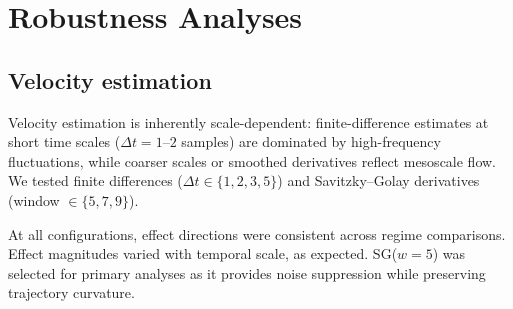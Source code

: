 \documentclass[5p,twocolumn,authoryear]{elsarticle}
\begin{document}
\section{Robustness Analyses}
\label{app:robustness}

\subsection{Velocity estimation}
\label{app:velocity_robustness}

Velocity estimation is inherently scale-dependent: finite-difference estimates at short time scales ($\Delta t = 1\text{--}2$ samples) are dominated by high-frequency fluctuations, while coarser scales or smoothed derivatives reflect mesoscale flow. We tested finite differences ($\Delta t \in \{1, 2, 3, 5\}$) and Savitzky--Golay derivatives (window $\in \{5, 7, 9\}$).

At all configurations, effect directions were consistent across regime comparisons. Effect magnitudes varied with temporal scale, as expected. SG($w = 5$) was selected for primary analyses as it provides noise suppression while preserving trajectory curvature.


\end{document}
